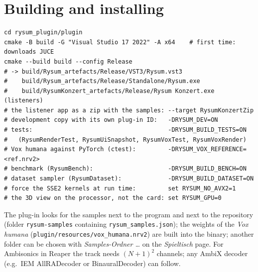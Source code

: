 \documentclass[11pt,a4paper,parskip=half,DIV=11,toc=bibliography]{scrartcl}
\newcommand{\ui}[1]{\emph{#1}}                 %
\newcommand{\fn}[1]{\mbox{\texttt{#1}}}
\begin{document}
\section{Building and installing}
\begin{small}
\begin{verbatim}
cd rysum_plugin/plugin
cmake -B build -G "Visual Studio 17 2022" -A x64    # first time: downloads JUCE
cmake --build build --config Release
# -> build/Rysum_artefacts/Release/VST3/Rysum.vst3
#    build/Rysum_artefacts/Release/Standalone/Rysum.exe
#    build/RysumKonzert_artefacts/Release/Rysum Konzert.exe  (listeners)
# the listener app as a zip with the samples: --target RysumKonzertZip
# development copy with its own plug-in ID:   -DRYSUM_DEV=ON
# tests:                                      -DRYSUM_BUILD_TESTS=ON
#   (RysumRenderTest, RysumUiSnapshot, RysumVoxTest, RysumVoxRender)
# Vox humana against PyTorch (ctest):         -DRYSUM_VOX_REFERENCE=<ref.nrv2>
# benchmark (RysumBench):                     -DRYSUM_BUILD_BENCH=ON
# dataset sampler (RysumDataset):             -DRYSUM_BUILD_DATASET=ON
# force the SSE2 kernels at run time:         set RYSUM_NO_AVX2=1
# the 3D view on the processor, not the card: set RYSUM_GPU=0
\end{verbatim}
\end{small}
The plug-in looks for the samples next to the program and next to the repository (folder \fn{rysum-samples} containing
\fn{rysum\_samples.json}); the weights of the \ui{Vox humana} (\fn{plugin/resources/vox\_humana.nrv2}) are built into the binary; another folder can be chosen with \ui{Samples-Ordner \dots} on the
\ui{Spieltisch} page. For Ambisonics in Reaper the track needs $(N+1)^2$ channels; any AmbiX decoder
(e.g.\ IEM AllRADecoder or BinauralDecoder) can follow.
\end{document}
